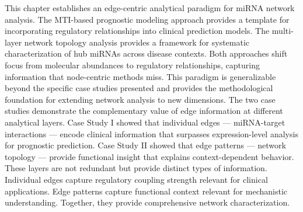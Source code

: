 This chapter establishes an edge-centric analytical paradigm for miRNA network analysis. The MTI-based prognostic modeling approach provides a template for incorporating regulatory relationships into clinical prediction models. The multi-layer network topology analysis provides a framework for systematic characterization of hub miRNAs across disease contexts. Both approaches shift focus from molecular abundances to regulatory relationships, capturing information that node-centric methods miss. This paradigm is generalizable beyond the specific case studies presented and provides the methodological foundation for extending network analysis to new dimensions. The two case studies demonstrate the complementary value of edge information at different analytical layers. Case Study I showed that individual edges --- miRNA-target interactions --- encode clinical information that surpasses expression-level analysis for prognostic prediction. Case Study II showed that edge patterns --- network topology --- provide functional insight that explains context-dependent behavior. These layers are not redundant but provide distinct types of information. Individual edges capture regulatory coupling strength relevant for clinical applications. Edge patterns capture functional context relevant for mechanistic understanding. Together, they provide comprehensive network characterization.
